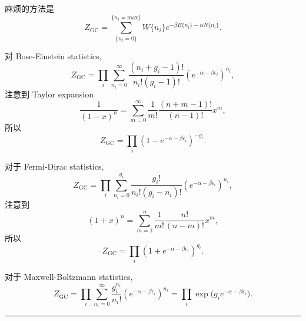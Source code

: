 \begin{itemize}
	\begin{tcolorbox}[title=calculation:]
		麻烦的方法是
		\begin{equation}
			Z_\text{GC} = \sum_{\{n_i = 0\}}^{\{n_i = \text{max}\}} W\{n_i\} e^{- \beta E\{n_i\} - \alpha N\{n_i\}}.
		\end{equation}
		
		\noindent\hdashrule[0.5ex]{\linewidth}{0.5pt}{1mm} %
		
		对 Bose-Einstein statistics,
		\begin{equation} \label{6.1.12}
			Z_\text{GC} = \prod_i \sum_{n_i = 0}^\infty \frac{(n_i + g_i - 1)!}{n_i! (g_i - 1)!} (e^{- \alpha - \beta \epsilon_i})^{n_i},
		\end{equation}
		注意到 Taylor expansion
		\begin{equation}
			\frac{1}{(1 - x)^n} = \sum_{m = 0}^\infty \frac{1}{m!} \frac{(n + m - 1)!}{(n - 1)!} x^m,
		\end{equation}
		所以
		\begin{equation}
			Z_\text{GC} = \prod_i (1 - e^{- \alpha - \beta \epsilon_i})^{- g_i}.
		\end{equation}
		
		\noindent\hdashrule[0.5ex]{\linewidth}{0.5pt}{1mm} %
		
		对于 Fermi-Dirac statistics,
		\begin{equation}
			Z_\text{GC} = \prod_i \sum_{n_i = 0}^{g_i} \frac{g_i!}{n_i! (g_i - n_i)!} (e^{- \alpha - \beta \epsilon_i})^{n_i},
		\end{equation}
		注意到
		\begin{equation}
			(1 + x)^n = \sum_{m = 1}^n \frac{1}{m!} \frac{n!}{(n - m)!} x^m,
		\end{equation}
		所以
		\begin{equation}
			Z_\text{GC} = \prod_i (1 + e^{- \alpha - \beta \epsilon_i})^{g_i}.
		\end{equation}
		
		\noindent\hdashrule[0.5ex]{\linewidth}{0.5pt}{1mm} %
		
		对于 Maxwell-Boltzmann statistics,
		\begin{equation} \label{6.1.18}
			Z_\text{GC} = \prod_i \sum_{n_i = 0}^\infty \frac{g_i^{n_i}}{n_i!} (e^{- \alpha - \beta \epsilon_i})^{n_i} = \prod_i \exp \Big( g_i e^{- \alpha - \beta \epsilon_i} \Big).
		\end{equation}
		
		\noindent\rule[0.5ex]{\linewidth}{0.5pt} %
		

\end{tcolorbox}
\end{itemize}
